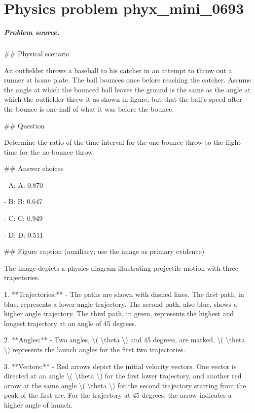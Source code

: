 
\chapter{Physics problem phyx\_mini\_0693}
\label{ch:PhyXMiniProblems_problem_phyx_mini_0693}

\paragraph{Problem source.}
\#\# Physical scenario

An outfielder throws a baseball to his catcher in an attempt to throw out a runner at home plate. The ball bounces once before reaching the catcher. Assume the angle at which the bounced ball leaves the ground is the same as the angle at which the outfielder threw it as shown in figure, but that the ball's speed after the bounce is one-half of what it was before the bounce.

\#\# Question

Determine the ratio of the time interval for the one-bounce throw to the flight time for the no-bounce throw.

\#\# Answer choices

- A: A: 0.870

- B: B: 0.647

- C: C: 0.949

- D: D: 0.511

\#\# Figure caption (auxiliary; use the image as primary evidence)

The image depicts a physics diagram illustrating projectile motion with three trajectories. 

1. **Trajectories:**
   - The paths are shown with dashed lines. The first path, in blue, represents a lower angle trajectory. The second path, also blue, shows a higher angle trajectory. The third path, in green, represents the highest and longest trajectory at an angle of 45 degrees.

2. **Angles:**
   - Two angles, \textbackslash{}( \textbackslash{}theta \textbackslash{}) and 45 degrees, are marked. \textbackslash{}( \textbackslash{}theta \textbackslash{}) represents the launch angles for the first two trajectories.

3. **Vectors:**
   - Red arrows depict the initial velocity vectors. One vector is directed at an angle \textbackslash{}( \textbackslash{}theta \textbackslash{}) for the first lower trajectory, and another red arrow at the same angle \textbackslash{}( \textbackslash{}theta \textbackslash{}) for the second trajectory starting from the peak of the first arc. For the trajectory at 45 degrees, the arrow indicates a higher angle of launch.

